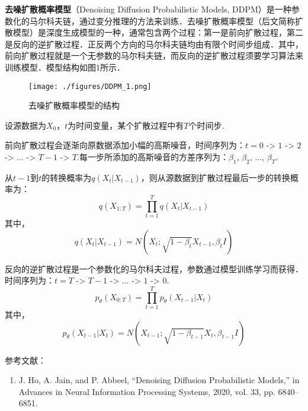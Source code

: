 
\textbf{去噪扩散概率模型}（Denoising Diffusion Probabilistic Models, DDPM）是一种参数化的马尔科夫链，通过变分推理的方法来训练．去噪扩散概率模型（后文简称扩散模型）是深度生成模型的一种，通常包含两个过程：第一是前向扩散过程，第二是反向的逆扩散过程．正反两个方向的马尔科夫链均由有限个时间步组成．其中，前向扩散过程就是一个无参数的马尔科夫链，而反向的逆扩散过程须要学习算法来训练模型．模型结构如图1所示．
\begin{figure}[ht]
\centering
\texttt{[image: ./figures/DDPM\_1.png]}
\caption{去噪扩散概率模型的结构} \label{DDPM_fig1}
\end{figure}

设源数据为$X_0$，$t$为时间变量，某个扩散过程中有$T$个时间步.

前向扩散过程会逐渐向原数据添加小幅的高斯噪音，时间序列为：$t=0$ -> $1$ -> $2$ -> ... -> $T-1$ -> $T$.每一步所添加的高斯噪音的方差序列为：$\beta_1$, $\beta_2$, ..., $\beta_T$.

从$t-1$到$t$的转换概率为$q(X_t|X_{t-1})$，则从源数据到扩散过程最后一步的转换概率为：
\begin{equation}
q(X_{1:T})=\prod_{t=1}^{T}q(X_{t}|X_{t-1})
\end{equation}
其中，
\begin{equation}
q(X_{t}|X_{t-1})=N(X_t;\sqrt{1-\beta_t}X_{t-1},\beta_tI)
\end{equation}

反向的逆扩散过程是一个参数化的马尔科夫过程，参数通过模型训练学习而获得．时间序列为：$t=T$ -> $T-1$ -> ... -> $1$ -> $0$.
\begin{equation}
p_{\theta}(X_{0:T})=\prod_{t=1}^{T}p_{\theta}(X_{t-1}|X_{t})
\end{equation}
其中，
\begin{equation}
p_{\theta}(X_{t-1}|X_{t})=N(X_{t-1};\sqrt{1-\beta_{t-1}}X_{t},\beta_{t-1}I)
\end{equation}


参考文献：
\begin{enumerate}
\item J. Ho, A. Jain, and P. Abbeel, “Denoising Diffusion Probabilistic Models,” in Advances in Neural Information Processing Systems, 2020, vol. 33, pp. 6840–6851.
\end{enumerate}